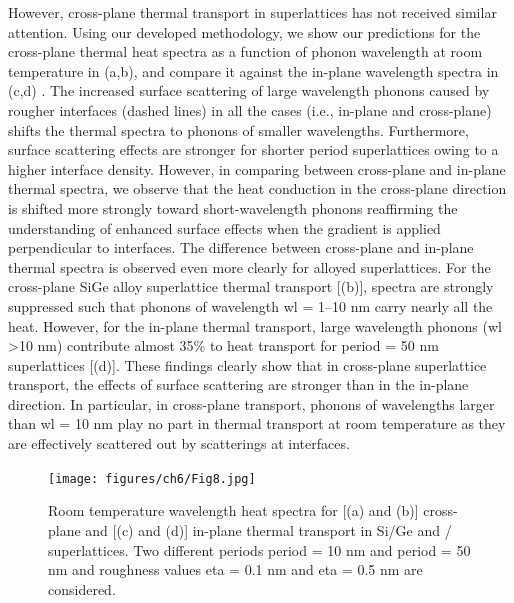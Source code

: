 \par However, cross-plane thermal transport in superlattices has not received similar attention. Using our developed methodology, we show our predictions for the cross-plane thermal heat spectra as a function of phonon wavelength at room temperature in (a,b), and compare it against the in-plane wavelength spectra in (c,d) \cite{RN396}. The increased surface scattering of large wavelength phonons caused by rougher interfaces (dashed lines) in all the cases (i.e., in-plane and cross-plane) shifts the thermal spectra to phonons of smaller wavelengths. Furthermore, surface scattering effects are stronger for shorter period superlattices owing to a higher interface density. However, in comparing between cross-plane and in-plane thermal spectra, we observe that the heat conduction in the cross-plane direction is shifted more strongly toward short-wavelength phonons reaffirming the understanding of enhanced surface effects when the gradient is applied perpendicular to interfaces. The difference between cross-plane and in-plane thermal spectra is observed even more clearly for alloyed superlattices. For the cross-plane SiGe alloy superlattice thermal transport [(b)], spectra are strongly suppressed such that phonons of wavelength \gls{wl} = 1–10 nm carry nearly all the heat. However, for the in-plane thermal transport, large wavelength phonons (\gls{wl} \textgreater 10 nm) contribute almost 35\% to heat transport for \gls{period} = 50 nm superlattices [(d)]. These findings clearly show that in cross-plane superlattice transport, the effects of surface scattering are stronger than in the in-plane direction. In particular, in cross-plane transport, phonons of wavelengths larger than \gls{wl} = 10 nm play no part in thermal transport at room temperature as they are effectively scattered out by scatterings at interfaces.
\begin{figure}[hbtp]
  \centering \texttt{[image: figures/ch6/Fig8.jpg]}
  \caption{Room temperature wavelength heat spectra for [(a) and (b)] cross-plane and [(c) and (d)] in-plane thermal transport in Si/Ge and / superlattices. Two different periods \gls{period} = 10 nm and \gls{period} = 50 nm and roughness values \gls{eta} = 0.1 nm and \gls{eta} = 0.5 nm are considered.}
  \label{fig:ch6-8}
\end{figure}

